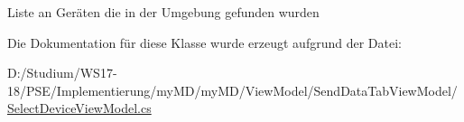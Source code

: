 Liste an Geräten die in der Umgebung gefunden wurden 



Die Dokumentation für diese Klasse wurde erzeugt aufgrund der Datei\+:\begin{DoxyCompactItemize}
\item 
D\+:/\+Studium/\+W\+S17-\/18/\+P\+S\+E/\+Implementierung/my\+M\+D/my\+M\+D/\+View\+Model/\+Send\+Data\+Tab\+View\+Model/\mbox{\hyperlink{_select_device_view_model_8cs}{Select\+Device\+View\+Model.\+cs}}\end{DoxyCompactItemize}
